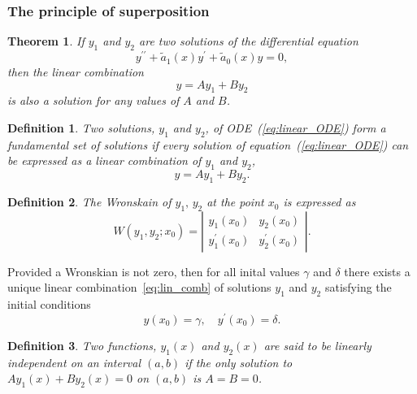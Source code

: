 \documentclass{article}
\newtheorem{theorem}{Theorem}
\newtheorem{definition}{Definition}
\begin{document}
\subsubsection{The principle of superposition}
\begin{theorem}
    If $y_1$ and $y_2$ are two solutions of the differential equation
    \begin{equation}
        y^{\prime\prime}+\tilde{a}_1(x)y^\prime + \tilde{a}_0(x)y=0, \label{eq:linear_ODE}
    \end{equation}
    then the linear combination
    \begin{equation}
        y = Ay_1 + By_2
    \end{equation}
    is also a solution for any values of $A$ and $B$.
\end{theorem}
\begin{definition}
    Two solutions, $y_1$ and $y_2$, of ODE~(\ref{eq:linear_ODE}) form a fundamental set of solutions if every solution of equation~(\ref{eq:linear_ODE}) can be expressed as a linear combination of $y_1$ and $y_2$,
    \begin{equation}
        y = Ay_1 + By_2. \label{eq:lin_comb}
    \end{equation}
\end{definition}
\begin{definition}
    The Wronskain of $y_1,\,y_2$ at the point $x_0$ is expressed as
    \begin{equation}
        W(y_1,y_2;x_0) = \left\vert \begin{array}{cc}
             y_1 (x_0) & y_2 (x_0) \\
             y_1^\prime (x_0) & y_2^\prime (x_0)
        \end{array} \right\vert.
    \end{equation}
\end{definition}
Provided a Wronskian is not zero, then for all inital values $\gamma$ and $\delta$ there exists a unique linear combination~\ref{eq:lin_comb} of solutions $y_1$ and $y_2$ satisfying the initial conditions 
\begin{equation}
    y(x_0) = \gamma,\quad y^\prime(x_0) = \delta.
\end{equation}
\begin{definition}
    Two functions, $y_1(x)$ and $y_2(x)$ are said to be linearly independent on an interval $(a,b)$ if the only solution to $Ay_1(x) + By_2(x) = 0$ on $(a,b)$ is $A=B=0$. 
\end{definition}
\end{document}
